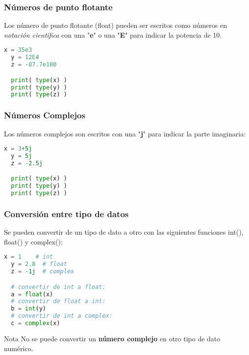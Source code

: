 \begin{frame}[fragile]
  \frametitle{Números de punto flotante}

  Los número de punto flotante (\textcolor{codeKeyword}{float}) pueden ser
  escritos como números en \emph{notación científica} con una "\textbf{e}"
  o una "\textbf{E}" para indicar la potencia de 10.

  \vspace{\baselineskip}
  \begin{lstlisting}[language=Python]
  x = 35e3
  y = 12E4
  z = -87.7e100

  print( type(x) )
  print( type(y) )
  print( type(z) )
  \end{lstlisting}
\end{frame}

\begin{frame}[fragile]
  \frametitle{Números Complejos}

  Los números complejos son escritos con una "\textbf{j}" para indicar
  la parte imaginaria:

  \vspace{\baselineskip}
  \begin{lstlisting}[language=Python]
  x = 3+5j
  y = 5j
  z = -2.5j

  print( type(x) )
  print( type(y) )
  print( type(z) )
  \end{lstlisting}
\end{frame}

\begin{frame}[fragile]
  \frametitle{Conversión entre tipo de datos}

  \vspace{\baselineskip}
  Se pueden convertir de un tipo de dato a otro con las siguientes
  funciones \textcolor{codeKeyword}{int}(), \textcolor{codeKeyword}{float}()
  y \textcolor{codeKeyword}{complex}():

  \begin{lstlisting}[language=Python]
  x = 1    # int
  y = 2.8  # float
  z = -1j  # complex

  # convertir de int a float:
  a = float(x)
  # convertir de float a int:
  b = int(y)
  # convertir de int a complex:
  c = complex(x)
  \end{lstlisting}

  \pausa
  \begin{alertblock}{Nota}
    No se puede convertir un \textbf{número complejo} en otro tipo de dato numérico.
  \end{alertblock}
\end{frame}

